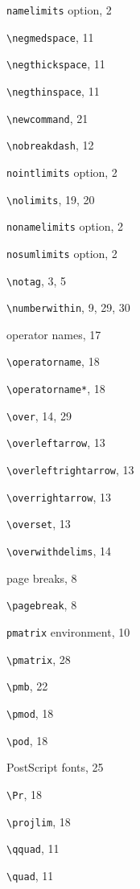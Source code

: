 \documentclass[leqno,titlepage,openany]{amsldoc}[1999/12/13]
\begin{document}
\begin{theindex}
  \indexspace

  \item \texttt{namelimits} option, 2
  \item \verb*+\negmedspace+, 11
  \item \verb*+\negthickspace+, 11
  \item \verb*+\negthinspace+, 11
  \item \verb*+\newcommand+, 21
  \item \verb*+\nobreakdash+, 12
  \item \texttt{nointlimits} option, 2
  \item \verb*+\nolimits+, 19, 20
  \item \texttt{nonamelimits} option, 2
  \item \texttt{nosumlimits} option, 2
  \item \verb*+\notag+, 3, 5
  \item \verb*+\numberwithin+, 9, 29, 30

  \indexspace

  \item operator names, 17
  \item \verb*+\operatorname+, 18
  \item \verb*+\operatorname*+, 18
  \item \verb*+\over+, 14, 29
  \item \verb*+\overleftarrow+, 13
  \item \verb*+\overleftrightarrow+, 13
  \item \verb*+\overrightarrow+, 13
  \item \verb*+\overset+, 13
  \item \verb*+\overwithdelims+, 14

  \indexspace

  \item page breaks, 8
  \item \verb*+\pagebreak+, 8
  \item \texttt{pmatrix} environment, 10
  \item \verb*+\pmatrix+, 28
  \item \verb*+\pmb+, 22
  \item \verb*+\pmod+, 18
  \item \verb*+\pod+, 18
  \item PostScript fonts, 25
  \item \verb*+\Pr+, 18
  \item \verb*+\projlim+, 18

  \indexspace

  \item \verb*+\qquad+, 11
  \item \verb*+\quad+, 11


\end{theindex}
\end{document}
